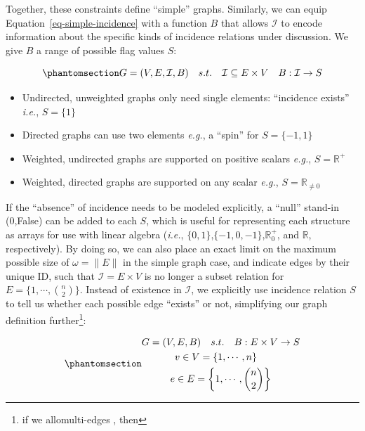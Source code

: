 \documentclass[%
	12pt,
		oneside,
		letterpaper
]{book}
\providecommand{\tightlist}{%
  \setlength{\itemsep}{0pt}\setlength{\parskip}{0pt}}
\begin{document}
Together, these constraints define ``simple'' graphs. Similarly, we can
equip Equation~\ref{eq-simple-incidence} with a function \(B\) that
allows \(\mathcal{I}\) to encode information about the specific kinds of
incidence relations under discussion. We give \(B\) a range of possible
flag values \(S\):

\begin{equation}\phantomsection\label{eq-map-incidence}{
G = (V,E,\mathcal{I},B) \quad s.t. \quad \mathcal{I} \subseteq E\times V\quad B:\mathcal{I}\rightarrow S
}\end{equation}

\begin{itemize}
\tightlist
\item
  Undirected, unweighted graphs only need single elements: ``incidence
  exists'' \emph{i.e.}, \(S=\{1\}\)
\item
  Directed graphs can use two elements \emph{e.g.}, a ``spin'' for
  \(S=\{-1,1\}\)
\item
  Weighted, undirected graphs are supported on positive scalars
  \emph{e.g.}, \(S=\mathbb{R}^+\)
\item
  Weighted, directed graphs are supported on any scalar \emph{e.g.},
  \(S=\mathbb{R}_{\neq0}\)
\end{itemize}

If the ``absence'' of incidence needs to be modeled explicitly, a
``null'' stand-in (0,False) can be added to each \(S\), which is useful
for representing each structure as arrays for use with linear algebra
(\emph{i.e.}, \(\{0,1\}\),\(\{-1,0,-1\}\),\(\mathbb{R}^+_0\), and
\(\mathbb{R}\), respectively). By doing so, we can also place an exact
limit on the maximum possible size of \(\omega=\|E\|\) in the simple
graph case, and indicate edges by their unique ID, such that
\(\mathcal{I}= E\times V\) is no longer a subset relation for
\(E=\{1,\cdots,{n\choose2} \}\). Instead of existence in
\(\mathcal{I}\), we explicitly use incidence relation \(S\) to tell us
whether each possible edge ``exists'' or not, simplifying our graph
definition further\footnote{ if we allomulti-edges , then}:

\begin{equation}\phantomsection\label{eq-incidence-graph}{
\begin{gathered}
G  = (V,E,B) \quad s.t. \quad B : E\times V \rightarrow S\\
v \in V = \{1,\cdots, n\}\quad \\
e \in E = \left\{1,\cdots, {n\choose 2} \right\}
\end{gathered}
}\end{equation}
\end{document}
